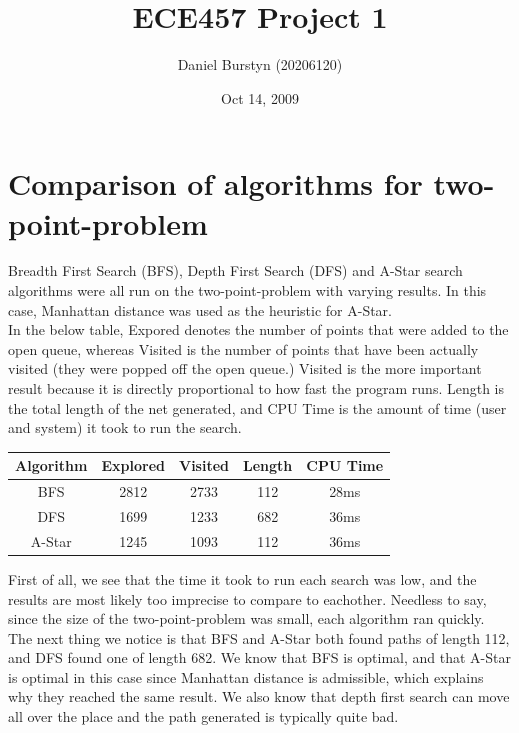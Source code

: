 \documentclass[12pt]{article}
\title{ECE457 Project 1}
\author{Daniel Burstyn (20206120)}
\date{Oct 14, 2009}
\begin{document}
\maketitle

\section{Comparison of algorithms for two-point-problem}
Breadth First Search (BFS), Depth First Search (DFS) and A-Star search
algorithms were all run on the two-point-problem with varying results.  In this
case, Manhattan distance was used as the heuristic for A-Star.\\

In the below table, Expored denotes the number of points that were added to the
open queue, whereas Visited is the number of points that have been actually
visited (they were popped off the open queue.)  Visited is the more important
result because it is directly proportional to how fast the program runs.  Length
is the total length of the net generated, and CPU Time is the amount of time
(user and system) it took to run the search.\\

\vspace{1em}

\begin{center}
\begin{tabular}{| c | c | c | c | c |}
\hline
Algorithm & Explored & Visited & Length & CPU Time \\
\hline
\hline
BFS & 2812 & 2733 & 112 & 28ms \\
\hline
DFS & 1699 & 1233 & 682 & 36ms \\
\hline
A-Star & 1245 & 1093 & 112 & 36ms \\
\hline
\end{tabular}
\end{center}

\vspace{1em}

First of all, we see that the time it took to run each search was low, and the
results are most likely too imprecise to compare to eachother.  Needless to say,
since the size of the two-point-problem was small, each algorithm ran quickly.\\

The next thing we notice is that BFS and A-Star both found paths of length 112,
and DFS found one of length 682.  We know that BFS is optimal, and that A-Star
is optimal in this case since Manhattan distance is admissible, which explains
why they reached the same result.  We also know that depth first search can move
all over the place and the path generated is typically quite bad.\\
\end{document}
